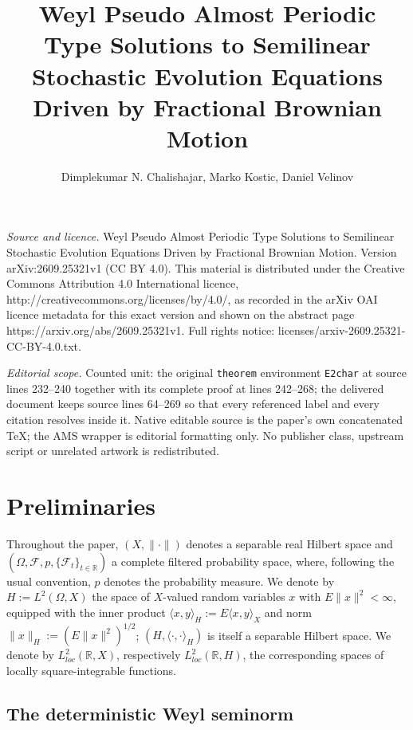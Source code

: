 \documentclass[10pt,a4paper]{amsart}
\begin{document}
\title[Weyl Pseudo Almost Periodic Type Solutions to Semilinear Sto]{Weyl Pseudo Almost Periodic Type Solutions to Semilinear Stochastic Evolution Equations Driven by Fractional Brownian Motion}
\author{Dimplekumar N. Chalishajar, Marko Kostic, Daniel Velinov}
\date{}
\maketitle
\noindent\emph{Source and licence.} Weyl Pseudo Almost Periodic Type Solutions to Semilinear Stochastic Evolution Equations Driven by Fractional Brownian Motion. Version arXiv:2609.25321v1 (CC BY 4.0). This material is distributed under the Creative Commons Attribution 4.0 International licence, http://creativecommons.org/licenses/by/4.0/, as recorded in the arXiv OAI licence metadata for this exact version and shown on the abstract page https://arxiv.org/abs/2609.25321v1. Full rights notice: licenses/arxiv-2609.25321-CC-BY-4.0.txt.\par\smallskip
\noindent\textit{Editorial scope.} Counted unit: the original \texttt{theorem} environment \texttt{E2char} at source lines 232--240 together with its complete proof at lines 242--268; the delivered document keeps source lines 64--269 so that every referenced label and every citation resolves inside it. Native editable source is the paper's own concatenated TeX; the AMS wrapper is editorial formatting only. No publisher class, upstream script or unrelated artwork is redistributed.
\section{Preliminaries}

Throughout the paper, $(X,\|\cdot\|)$ denotes a separable real Hilbert space and $(\Omega,\mathcal F,p,\{\mathcal F_t\}_{t\in\mathbb R})$ a complete filtered probability space, where, following the usual convention, $p$ denotes the probability measure. We denote by $H:=L^2(\Omega,X)$ the space of $X$-valued random variables $x$ with $E\|x\|^2<\infty$, equipped with the inner product $\langle x,y\rangle_H:=E\langle x,y\rangle_X$ and norm $\|x\|_H:=(E\|x\|^2)^{1/2}$; $(H,\langle\cdot,\cdot\rangle_H)$ is itself a separable Hilbert space. We denote by $L^2_{loc}(\mathbb R,X)$, respectively $L^2_{loc}(\mathbb R,H)$, the corresponding spaces of locally square-integrable functions.

\subsection{The deterministic Weyl seminorm}
\end{document}
